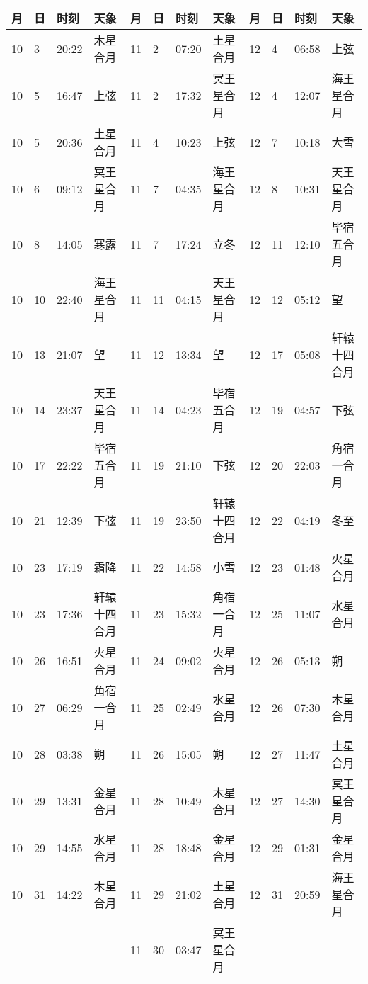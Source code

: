 \begin{tabular}{llll|llll|llll}
\hline
	月 & 日 & 时刻 & 天象 &         %
	月 & 日 & 时刻 & 天象 &
	月 & 日 & 时刻 & 天象 \tabularnewline
\hline
10 & 3 & 20:22 & 木星合月 & 11 & 2 & 07:20 & 土星合月 & 12 & 4 & 06:58 & 上弦 \tabularnewline
10 & 5 & 16:47 & 上弦 & 11 & 2 & 17:32 & 冥王星合月 & 12 & 4 & 12:07 & 海王星合月 \tabularnewline
10 & 5 & 20:36 & 土星合月 & 11 & 4 & 10:23 & 上弦 & 12 & 7 & 10:18 & 大雪 \tabularnewline
10 & 6 & 09:12 & 冥王星合月 & 11 & 7 & 04:35 & 海王星合月 & 12 & 8 & 10:31 &  天王星合月 \tabularnewline
10 & 8 & 14:05 & 寒露 & 11 & 7 & 17:24 & 立冬 & 12 & 11 & 12:10 & 毕宿五合月 \tabularnewline
10 & 10 & 22:40 & 海王星合月 & 11 & 11 & 04:15 &  天王星合月 & 12 & 12 & 05:12 & 望 \tabularnewline
10 & 13 & 21:07 & 望 & 11 & 12 & 13:34 & 望 & 12 & 17 & 05:08 & 轩辕十四合月 \tabularnewline
10 & 14 & 23:37 &  天王星合月 & 11 & 14 & 04:23 & 毕宿五合月 & 12 & 19 & 04:57 & 下弦 \tabularnewline
10 & 17 & 22:22 & 毕宿五合月 & 11 & 19 & 21:10 & 下弦 & 12 & 20 & 22:03 & 角宿一合月 \tabularnewline
10 & 21 & 12:39 & 下弦 & 11 & 19 & 23:50 & 轩辕十四合月 & 12 & 22 & 04:19 & 冬至 \tabularnewline
10 & 23 & 17:19 & 霜降 & 11 & 22 & 14:58 & 小雪 & 12 & 23 & 01:48 & 火星合月 \tabularnewline
10 & 23 & 17:36 & 轩辕十四合月 & 11 & 23 & 15:32 & 角宿一合月 & 12 & 25 & 11:07 & 水星合月 \tabularnewline
10 & 26 & 16:51 & 火星合月 & 11 & 24 & 09:02 & 火星合月 & 12 & 26 & 05:13 & 朔 \tabularnewline
10 & 27 & 06:29 & 角宿一合月 & 11 & 25 & 02:49 & 水星合月 & 12 & 26 & 07:30 & 木星合月 \tabularnewline
10 & 28 & 03:38 & 朔 & 11 & 26 & 15:05 & 朔 & 12 & 27 & 11:47 & 土星合月 \tabularnewline
10 & 29 & 13:31 & 金星合月 & 11 & 28 & 10:49 & 木星合月 & 12 & 27 & 14:30 & 冥王星合月 \tabularnewline
10 & 29 & 14:55 & 水星合月 & 11 & 28 & 18:48 & 金星合月 & 12 & 29 & 01:31 & 金星合月 \tabularnewline
10 & 31 & 14:22 & 木星合月 & 11 & 29 & 21:02 & 土星合月 & 12 & 31 & 20:59 & 海王星合月 \tabularnewline
 &  &  &  & 11 & 30 & 03:47 & 冥王星合月 &  &  &  &  \tabularnewline
\hline \end{tabular}
